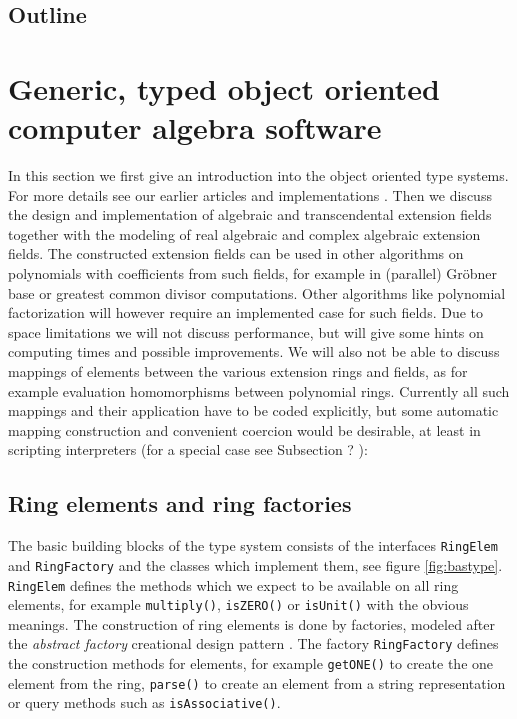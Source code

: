 \documentclass{llncs}
\newcommand{\code}[1]{\texttt{#1}}
\begin{document}
\subsection{Outline} %



\section{Generic, typed object oriented computer algebra software} %
\label{sec:asto}

In this section we first give an introduction into the object oriented
type systems. For more details see our earlier articles and implementations
\cite{JollyKredel:2009,JollyKredel:2010,Jolly:2010,Kredel:2000,Kredel:2008a,Kredel:2008}. %
Then we discuss the design and implementation of algebraic and
transcendental extension fields together with the modeling of real
algebraic and complex algebraic extension fields. The constructed
extension fields can be used in other algorithms on polynomials with
coefficients from such fields, for example in (parallel) Gr\"obner
base or greatest common divisor computations. Other algorithms like
polynomial factorization will however require an implemented case for
such fields. Due to space limitations we will not discuss performance,
but will give some hints on computing times and possible improvements.
We will also not be able to discuss mappings of elements between the
various extension rings and fields, as for example evaluation
homomorphisms between polynomial rings. Currently all such mappings
and their application have to be coded explicitly, but some automatic
mapping construction and convenient coercion would be desirable, at
least in scripting interpreters (for a special case see Subsection
? ): %


\subsection{Ring elements and ring factories} %

The basic building blocks of the type system consists of the
interfaces \code{RingElem} and \code{RingFactory} and the classes
which implement them, see figure \ref{fig:bastype}. \code{RingElem}
defines the methods which we expect to be available on all ring
elements, for example \code{multiply()},
\code{isZERO()} or \code{isUnit()} with the obvious meanings. The
construction of ring elements is done by factories, modeled after the
{\em abstract factory} creational design pattern \cite{Gamma:1995}.
The factory \code{RingFactory} defines the construction methods for
elements, for example \code{get\-ONE()} to create the one element from
the ring, 
\code{parse()} to create an element from a string representation or query methods such as
\code{is\-Asso\-ciative()}. %
\end{document}
